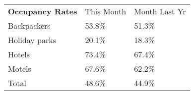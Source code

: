 \begin{tabular}[t]{p{4.8cm}>{\hfill}p{1.3cm}>{\hfill}p{1.4cm}}
 \textbf{Occupancy Rates} & This Month & Month Last Yr \\ 
 Backpackers & 53.8\% & 51.3\% \\ 
  Holiday parks & 20.1\% & 18.3\% \\ 
  Hotels & 73.4\% & 67.4\% \\ 
  Motels & 67.6\% & 62.2\% \\ 
  Total & 48.6\% & 44.9\% \\ 
  \end{tabular}
